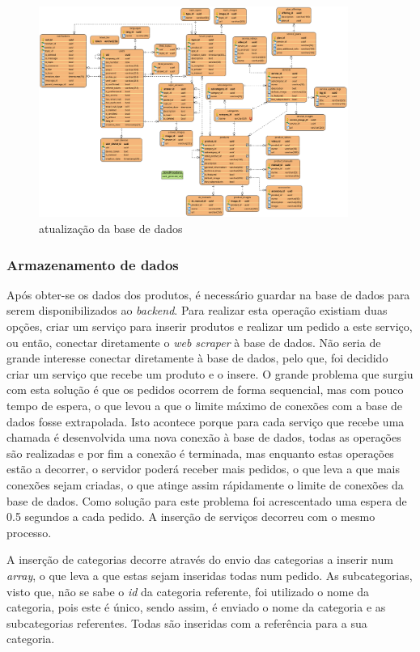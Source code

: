 \begin{figure}[htb]
    \centering
    \includegraphics[width=0.9\textwidth]{images/diagramas/bd_final.png}
    \caption{atualização da base de dados}
    \label{webscraper_bd}
\end{figure}

\newpage

\subsubsection{Armazenamento de dados}

Após obter-se os dados dos produtos, é necessário guardar na base de dados para serem disponibilizados ao \textit{backend}. Para realizar esta operação existiam duas opções, criar um serviço para inserir produtos e realizar um pedido a este serviço, ou então, conectar diretamente o \textit{web scraper} à base de dados. Não seria de grande interesse conectar diretamente à base de dados, pelo que, foi decidido criar um serviço que recebe um produto e o insere. O grande problema que surgiu com esta solução é que os pedidos ocorrem de forma sequencial, mas com pouco tempo de espera, o que levou a que o limite máximo de conexões com a base de dados fosse extrapolada. Isto acontece porque para cada serviço que recebe uma chamada é desenvolvida uma nova conexão à base de dados, todas as operações são realizadas e por fim a conexão é terminada, mas enquanto estas operações estão a decorrer, o servidor poderá receber mais pedidos, o que leva a que mais conexões sejam criadas, o que atinge assim rápidamente o limite de conexões da base de dados. Como solução para este problema foi acrescentado uma espera de 0.5 segundos a cada pedido. A inserção de serviços decorreu com o mesmo processo.

A inserção de categorias decorre através do envio das categorias a inserir num \textit{array}, o que leva a que estas sejam inseridas todas num pedido. As subcategorias, visto que, não se sabe o \textit{id} da categoria referente, foi utilizado o nome da categoria, pois este é único, sendo assim, é enviado o nome da categoria e as subcategorias referentes. Todas são inseridas com a referência para a sua categoria.
